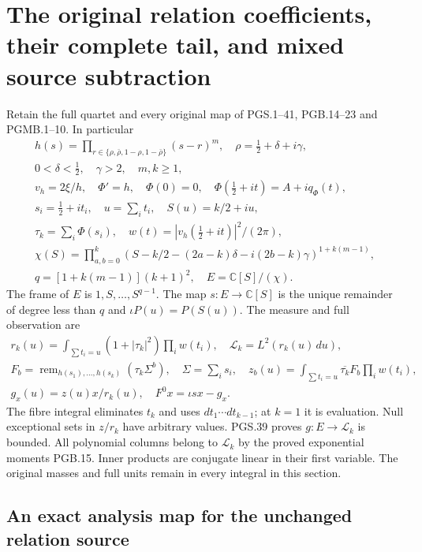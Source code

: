 \section{The original relation coefficients, their complete tail, and mixed source subtraction}
\label{GraphV2:sec:pgrt}

Retain the full quartet and every original map of PGS.1--41,
PGB.14--23 and PGMB.1--10. In particular
\[
\begin{gathered}
 h(s)=\prod_{r\in\{\rho,\bar\rho,1-\rho,1-\bar\rho\}}(s-r)^m,
 \quad \rho=\tfrac12+\delta+i\gamma,\\
 0<\delta<\tfrac12,\quad\gamma>2,\quad m,k\geq1,\\
 v_h=2\xi/h,\quad\Phi'=h,\quad\Phi(0)=0,
 \quad\Phi(\tfrac12+it)=A+iq_\Phi(t),\\
 s_i=\tfrac12+it_i,\quad u=\sum_it_i,\quad S(u)=k/2+iu,\\
 \tau_k=\sum_i\Phi(s_i),\quad w(t)=|v_h(\tfrac12+it)|^2/(2\pi),\\
 \chi(S)=\prod_{a,b=0}^k
 (S-k/2-(2a-k)\delta-i(2b-k)\gamma)^{1+k(m-1)},\\
 q=[1+k(m-1)](k+1)^2,\quad E=\mathbb{C}[S]/(\chi).
\end{gathered}
\tag{PGRT.1}\label{GraphV2:eq:pgrt-original}
\]
The frame of $E$ is $1,S,\ldots,S^{q-1}$. The map $s:E\to\mathbb{C}[S]$
is the unique remainder of degree less than $q$ and $\iota P(u)=P(S(u))$.
The measure and full observation are
\[
\begin{gathered}
 r_k(u)=\int_{\sum t_i=u}(1+|\tau_k|^2)\prod_iw(t_i),
 \quad\mathscr L_k=L^2(r_k(u)\,du),\\
 F_b=\operatorname{rem}_{h(s_1),\ldots,h(s_k)}(\tau_k\Sigma^b),
 \quad \Sigma=\sum_i s_i,\quad
 z_b(u)=\int_{\sum t_i=u}\overline{\tau_k}F_b\prod_iw(t_i),\\
 g_x(u)=z(u)x/r_k(u),\quad F^0x=\iota sx-g_x.
\end{gathered}
\tag{PGRT.2}\label{GraphV2:eq:pgrt-f0}
\]
The fibre integral eliminates $t_k$ and uses $dt_1\cdots dt_{k-1}$;
at $k=1$ it is evaluation. Null exceptional sets in $z/r_k$ have
arbitrary values. PGS.39 proves $g:E\to\mathscr L_k$ is bounded.
All polynomial columns belong to $\mathscr L_k$ by the proved
exponential moments PGB.15. Inner products are conjugate linear
in their first variable. The original masses and full units remain
in every integral in this section.

\subsection{An exact analysis map for the unchanged relation source}

